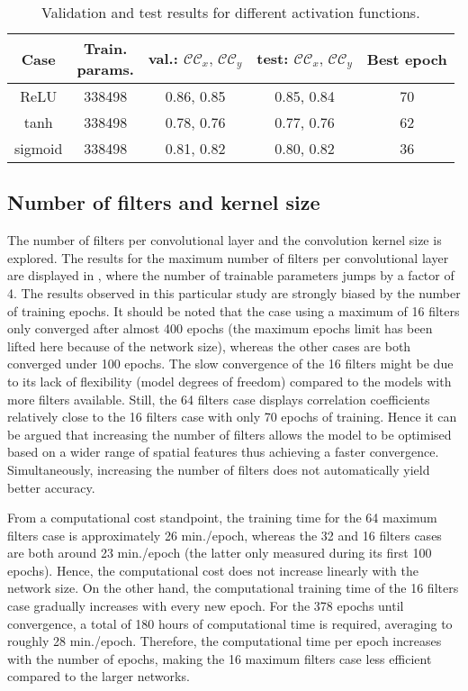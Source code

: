 \documentclass[../main.tex]{subfiles}
\begin{document}
{\renewcommand{\arraystretch}{1.2}
\begin{table}
\begin{center}
\begin{tabular}{ccccc}
\toprule
Case & \specialcell{Train.\\params.} & val.: $\mathcal{CC}_x,\,\mathcal{CC}_y$ & test: $\mathcal{CC}_x,\,\mathcal{CC}_y$ & Best epoch\\
\midrule
ReLU & 338498 & 0.86, 0.85 & 0.85, 0.84 & 70 \\
tanh & 338498 & 0.78, 0.76 & 0.77, 0.76 & 62\\
sigmoid & 338498 & 0.81, 0.82 & 0.80, 0.82 & 36\\
\bottomrule
\end{tabular}
\end{center}
\caption{Validation and test results for different activation functions.}
\label{tab:activation_correlation}
\end{table}}

\subsection{Number of filters and kernel size}

The number of filters per convolutional layer and the convolution kernel size is explored.
The results for the maximum number of filters per convolutional layer are displayed in , where the number of trainable parameters jumps by a factor of 4.
The results observed in this particular study are strongly biased by the number of training epochs.
It should be noted that the case using a maximum of 16 filters only converged after almost 400 epochs (the maximum epochs limit has been lifted here because of the network size), whereas the other cases are both converged under 100 epochs.
The slow convergence of the 16 filters might be due to its lack of flexibility (model degrees of freedom) compared to the models with more filters available.
Still, the 64 filters case displays correlation coefficients relatively close to the 16 filters case with only 70 epochs of training.
Hence it can be argued that increasing the number of filters allows the model to be optimised based on a wider range of spatial features thus achieving a faster convergence.
Simultaneously, increasing the number of filters does not automatically yield better accuracy.

From a computational cost standpoint, the training time for the 64 maximum filters case is approximately 26 min./epoch, whereas the 32 and 16 filters cases are both around 23 min./epoch (the latter only measured during its first 100 epochs).
Hence, the computational cost does not increase linearly with the network size.
On the other hand, the computational training time of the 16 filters case gradually increases with every new epoch.
For the 378 epochs until convergence, a total of 180 hours of computational time is required, averaging to roughly 28 min./epoch.
Therefore, the computational time per epoch increases with the number of epochs, making the 16 maximum filters case less efficient compared to the larger networks.
\end{document}
